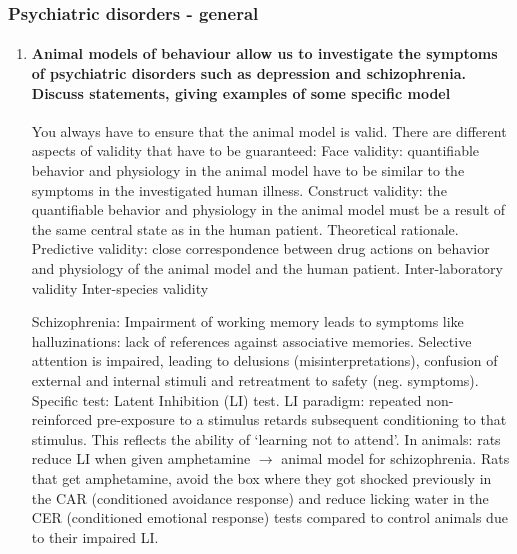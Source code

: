 \documentclass[12pt,article,oneside,a4paper]{memoir}
\begin{document}
\subsubsection{Psychiatric disorders - general}
\begin{enumerate}
\item \paragraph{Animal models of behaviour allow us to investigate the symptoms of psychiatric disorders such as depression and schizophrenia. Discuss statements, giving examples of some specific model}

You always have to ensure that the animal model is valid. There are different aspects of validity that have to be guaranteed:
Face validity: quantifiable behavior and physiology in the animal model have to be similar to the symptoms in the investigated human illness.
Construct validity: the quantifiable behavior and physiology in the animal model must be a result of the same central state as in the human patient. Theoretical rationale.
Predictive validity: close correspondence between drug actions on behavior and physiology of the animal model and the human patient.
Inter-laboratory validity
Inter-species validity

 Schizophrenia:
Impairment of working memory leads to symptoms like halluzinations: lack of references against associative memories.
	Selective attention is impaired, leading to delusions (misinterpretations), confusion of external and internal stimuli and retreatment to safety (neg. symptoms). 
Specific test: Latent Inhibition (LI) test. LI paradigm: repeated non-reinforced pre-exposure to a stimulus retards subsequent conditioning to that stimulus. This reflects the ability of ‘learning not to attend’. In animals: rats reduce LI when given amphetamine $\rightarrow$ animal model for schizophrenia. Rats that get amphetamine, avoid the box where they got shocked previously in the CAR (conditioned avoidance response) and reduce licking water in the CER (conditioned emotional response) tests compared to control animals due to their impaired LI.



\end{enumerate}
\end{document}
